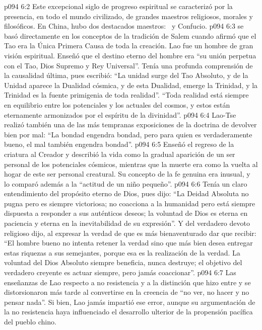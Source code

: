 \vs p094 6:2 Este excepcional siglo de progreso espiritual se caracterizó por la presencia, en todo el mundo civilizado, de grandes maestros religiosos, morales y filosóficos. En China, hubo dos destacados maestros:  y Confucio.
\vs p094 6:3 \pc {} se basó directamente en los conceptos de la tradición de Salem cuando afirmó que el Tao era la Única Primera Causa de toda la creación. Lao fue un hombre de gran visión espiritual. Enseñó que el destino eterno del hombre era “su unión perpetua con el Tao, Dios Supremo y Rey Universal”. Tenía una profunda comprensión de la causalidad última, pues escribió: “La unidad surge del Tao Absoluto, y de la Unidad aparece la Dualidad cósmica, y de esta Dualidad, emerge la Trinidad, y la Trinidad es la fuente primigenia de toda realidad”. “Toda realidad está siempre en equilibrio entre los potenciales y los actuales del cosmos, y estos están eternamente armonizados por el espíritu de la divinidad”.
\vs p094 6:4 Lao\hyp{}Tse realizó también una de las más tempranas exposiciones de la doctrina de devolver bien por mal: “La bondad engendra bondad, pero para quien es verdaderamente bueno, el mal también engendra bondad”.
\vs p094 6:5 Enseñó el regreso de la criatura al Creador y describió la vida como la gradual aparición de un ser personal de los potenciales cósmicos, mientras que la muerte era como la vuelta al hogar de este ser personal creatural. Su concepto de la fe genuina era inusual, y lo comparó además a la “actitud de un niño pequeño”.
\vs p094 6:6 Tenía un claro entendimiento del propósito eterno de Dios, pues dijo: “La Deidad Absoluta no pugna pero es siempre victoriosa; no coacciona a la humanidad pero está siempre dispuesta a responder a sus auténticos deseos; la voluntad de Dios es eterna en paciencia y eterna en la inevitabilidad de su expresión”. Y del verdadero devoto religioso dijo, al expresar la verdad de que es más bienaventurado dar que recibir: “El hombre bueno no intenta retener la verdad sino que más bien desea entregar estas riquezas a sus semejantes, porque esa es la realización de la verdad. La voluntad del Dios Absoluto siempre beneficia, nunca destruye; el objetivo del verdadero creyente es actuar siempre, pero jamás coaccionar”.
\vs p094 6:7 Las enseñanzas de Lao respecto a no resistencia y a la distinción que hizo entre  y  se distorsionaron más tarde al convertirse en la creencia de “no ver, no hacer y no pensar nada”. Si bien, Lao jamás impartió ese error, aunque su argumentación de la no resistencia haya influenciado el desarrollo ulterior de la propensión pacífica del pueblo chino.
